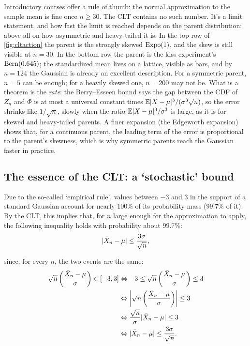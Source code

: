 \begin{bridge}
Introductory courses offer a rule of thumb: the normal approximation to the sample mean is fine once $n \geq 30$.
The CLT contains no such number.
It's a limit statement, and how fast the limit is reached depends on the parent distribution: above all on how asymmetric and heavy-tailed it is.
In the top row of \cref{fig:cltaction} the parent is the strongly skewed $\Expo(1)$, and the skew is still visible at $n = 30$.
In the bottom row the parent is the kiss experiment's $\Bern(0.645)$; the standardized mean lives on a lattice, visible as bars, and by $n = 124$ the Gaussian is already an excellent description.
For a symmetric parent, $n = 5$ can be enough; for a heavily skewed one, $n = 200$ may not be.
What is a theorem is the \textit{rate}: the Berry--Esseen bound says the gap between the CDF of $Z_n$ and $\Phi$ is at most a universal constant times $\E\abs{X - \mu}^3 / (\sigma^3 \sqrt{n})$, so the error shrinks like $1/\sqrt{n}$, slowly when the ratio $\E\abs{X - \mu}^3/\sigma^3$ is large, as it is for skewed and heavy-tailed parents.
A finer expansion (the Edgeworth expansion) shows that, for a continuous parent, the leading term of the error is proportional to the parent's skewness, which is why symmetric parents reach the Gaussian faster in practice.
\end{bridge}

\subsection{The essence of the CLT: a `stochastic' bound}

Due to the so-called `empirical rule', values between $-3$ and $3$ in the support of a standard Gaussian account for nearly 100\% of its probability mass ($99.7\%$ of it).
By the CLT, this implies that, for $n$ large enough for the approximation to apply, the following inequality holds with probability about $99.7\%$:
\[
\abs{\bar{X}_n - \mu} \leq \frac{3 \sigma}{\sqrt{n}},
\]

since, for every $n$, the two events are the same:
\begin{align*}
\sqrt{n} \left( \frac{\bar{X}_n - \mu}{\sigma} \right) \in [-3, 3] &\Leftrightarrow -3 \leq \sqrt{n} \left( \frac{\bar{X}_n - \mu}{\sigma} \right) \leq 3 \\
&\Leftrightarrow \abs*{ \sqrt{n} \left( \frac{\bar{X}_n - \mu}{\sigma} \right) } \leq 3 \\
&\Leftrightarrow \frac{\sqrt{n}}{\sigma} \abs{ \bar{X}_n - \mu } \leq 3 \\
&\Leftrightarrow \abs{ \bar{X}_n - \mu } \leq  \frac{3 \sigma}{\sqrt{n}}.
\end{align*}

